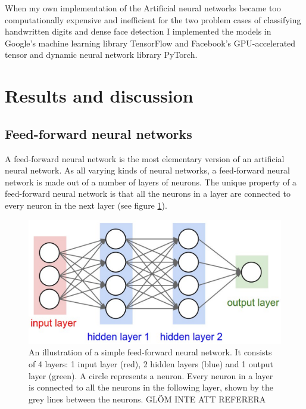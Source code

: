 \documentclass[a4paper,11pt,twoside]{article}
\begin{document}
When my own implementation of the Artificial neural networks became too computationally expensive and inefficient for the two problem cases of classifying handwritten digits and dense face detection I implemented the models in Google's machine learning library TensorFlow and Facebook's GPU-accelerated tensor and dynamic neural network library PyTorch.

\newpage
\section{Results and discussion}

\subsection{Feed-forward neural networks}
A feed-forward neural network is the most elementary version of an artificial neural network. As all varying kinds of neural networks, a feed-forward neural network is made out of a number of layers of neurons. The unique property of a feed-forward neural network is that all the neurons in a layer are connected to every neuron in the next layer (see figure \ref{figfeedforward}). \cite{cs231n}

\begin{figure}[h]
	\centering
  		\includegraphics[scale=1]{feedforward.png}
  	\caption{An illustration of a simple feed-forward neural network. It consists of 4 layers: 1 input layer (red), 2 hidden layers (blue) and 1 output layer (green). A circle represents a neuron. Every neuron in a layer is connected to all the neurons in the following layer, shown by the grey lines between the neurons. GLÖM INTE ATT REFERERA} \label{figfeedforward}
\end{figure}
\end{document}
